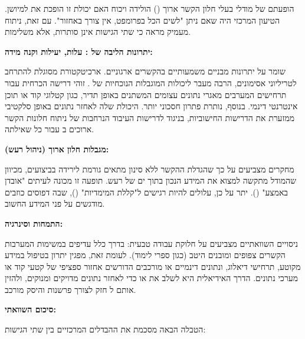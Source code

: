 
הופעתם של מודלי  בעלי חלון הקשר ארוך () הולידה ויכוח האם יכולת זו הופכת את  למיושן. הטיעון המרכזי היה שאם ניתן "לשים הכל בפרומפט, אין צורך באחזור". עם זאת, ניתוח מעמיק מראה כי שתי הגישות אינן סותרות, אלא משלימות.

\textbf{יתרונות הליבה של : עלות, יעילות וקנה מידה:}

 שומר על יתרונות מבניים משמעותיים בהקשרים ארגוניים. ארכיטקטורת  מסוגלת להתרחב לטריליוני אסימונים, הרבה מעבר ליכולות המוגבלות הנוכחיות של . זוהי דרישה הכרחית עבור תרחישים המערבים מאגרי נתונים עצומים המשתנים באופן תדיר, כגון קטלוגי קוד או תוכן אינטרנטי דינמי. בנוסף,  נותרת פתרון חסכוני יותר. היכולת שלה לאחזר נתונים באופן סלקטיבי ממזערת את הדרישות החישוביות, בניגוד לדרישות העיבוד הנרחבות של ניתוח חלונות הקשר ארוכים ב עבור כל שאילתה.

\textbf{מגבלות  חלון ארוך (ניהול רעש):}

מחקרים מצביעים על כך שהגדלת ההקשר ללא סינון מתאים גורמת לירידה בביצועים, מכיוון שהמודל מתקשה למצוא את המידע הנכון בתוך ים של רעש. תופעה זו מכונה לעיתים "אובדן באמצע" ()\cite{liu2023lost}. יתר על כן,  עלולים להיות רגישים ל"קללת המימדיות" (), שבה דפוסים כוזבים מודגשים על פני המידע החשוב.

\textbf{התמחות וסינרגיה:}

ניסויים השוואתיים מצביעים על חלוקת עבודה טבעית:  בדרך כלל עדיפים במשימות המערבות הקשרים צפופים ומובנים היטב (כגון ספרי לימוד). לעומת זאת,  מפגין יתרון בטיפול במידע מקוטע, תרחישי דיאלוג, ונתונים דינמיים או מורכבים הדורשים אחזור ספציפי של קטעי קוד או מערכי נתונים. הדרך האידיאלית היא לשלב את  או  כדי לאחזר נתונים מדויקים ומנוקים, ולהזין אותם ל חזק לצורך פרשנות והיסק מורכב.

\textbf{סיכום השוואתי:}

הטבלה הבאה מסכמת את ההבדלים המרכזיים בין שתי הגישות:

